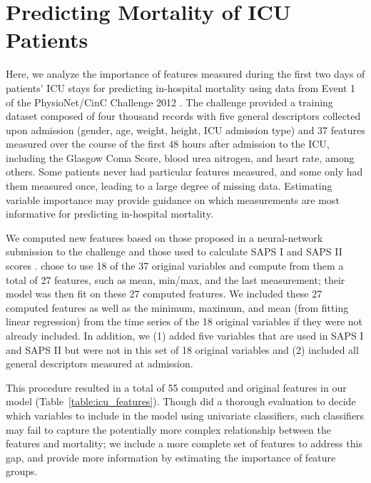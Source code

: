 \documentclass{article}
\begin{document}
\section{Predicting Mortality of ICU Patients}


Here, we analyze the importance of features measured during the first two days of patients' ICU stays for predicting in-hospital mortality using data from Event 1 of the PhysioNet/CinC Challenge 2012 \citep{silva2012predicting}.
The challenge provided a training dataset composed of four thousand records with five general descriptors collected upon admission (gender, age, weight, height, ICU admission type) and 37 features measured over the course of the first 48 hours after admission to the ICU, including the Glasgow Coma Score, blood urea nitrogen, and heart rate, among others.
Some patients never had particular features measured, and some only had them measured once, leading to a large degree of missing data.
Estimating variable importance may provide guidance on which measurements are most informative for predicting in-hospital mortality.

We computed new features based on those proposed in a neural-network submission to the challenge \citep{xia2012neural} and those used to calculate SAPS I and SAPS II scores \citep{le1984simplified, le1993new}.
\citet{xia2012neural} chose to use 18 of the 37 original variables and compute from them a total of 27 features, such as mean, min/max, and the last measurement; their model was then fit on these 27 computed features.
We included these 27 computed features as well as the minimum, maximum, and mean (from fitting linear regression) from the time series of the 18 original variables if they were not already included.
In addition, we (1) added five variables that are used in SAPS I and SAPS II but were not in this set of 18 original variables and (2) included all general descriptors measured at admission.

This procedure resulted in a total of 55 computed and original features in our model (Table~\ref{table:icu_features}).
Though \citet{xia2012neural} did a thorough evaluation to decide which variables to include in the model using univariate classifiers, such classifiers may fail to capture the potentially more complex relationship between the features and mortality; we include a more complete set of features to address this gap, and provide more information by estimating the importance of feature groups.
\end{document}
